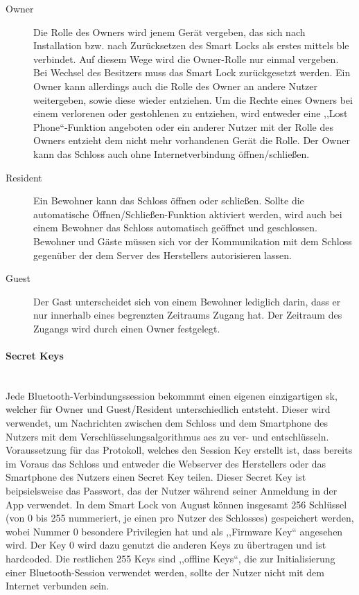 		\begin{description}
		    \item [Owner] Die Rolle des Owners wird jenem Gerät vergeben, das sich nach Installation bzw. nach Zurücksetzen des Smart Locks als erstes mittels \gls{ble} verbindet. 
   		        Auf diesem Wege wird die Owner-Rolle nur einmal vergeben. 
   		        Bei Wechsel des Besitzers muss das Smart Lock zurückgesetzt werden. 
   		        Ein Owner kann allerdings auch die Rolle des Owner an andere Nutzer weitergeben, sowie diese wieder entziehen. 
   		        Um die Rechte eines Owners bei einem verlorenen oder gestohlenen zu entziehen, wird entweder eine ,,Lost Phone``-Funktion angeboten oder ein anderer Nutzer mit der Rolle des Owners entzieht dem nicht mehr vorhandenen Gerät die Rolle. 
   		        Der Owner kann das Schloss auch ohne Internetverbindung öffnen/schließen. 
   	        \item [Resident] Ein Bewohner kann das Schloss öffnen oder schließen. 
   	            Sollte die automatische Öffnen/Schließen-Funktion aktiviert werden, wird auch bei einem Bewohner das Schloss automatisch geöffnet und geschlossen. 
   	            Bewohner und Gäste müssen sich vor der Kommunikation mit dem Schloss gegenüber der dem Server des Herstellers autorisieren lassen.
   	        \item [Guest] Der Gast unterscheidet sich von einem Bewohner lediglich darin, dass er nur innerhalb eines begrenzten Zeitraums Zugang hat. 
                Der Zeitraum des Zugangs wird durch einen Owner festgelegt.
		\end{description}
        
		\paragraph{\textrm{Secret Keys}}\hspace{0pt}\smallskip\\
		Jede Bluetooth-Verbindungssession bekommmt einen eigenen einzigartigen \gls{sk}, welcher für Owner und Guest/Resident unterschiedlich entsteht.
		Dieser wird verwendet, um Nachrichten zwischen dem Schloss und dem Smartphone des Nutzers mit dem Verschlüsselungsalgorithmus \gls{aes} zu ver- und entschlüsseln. 
		Voraussetzung für das Protokoll, welches den Session Key erstellt ist, dass bereits im Voraus das Schloss und entweder die Webserver des Herstellers oder das Smartphone des Nutzers einen Secret Key teilen. 
		Dieser Secret Key ist beipsielsweise das Passwort, das der Nutzer während seiner Anmeldung in der App verwendet. 
		In dem Smart Lock von August können insgesamt 256 Schlüssel (von 0 bis 255 nummeriert, je einen pro Nutzer des Schlosses) gespeichert werden, wobei Nummer 0 besondere Privilegien hat und als ,,Firmware Key`` angesehen wird.\cite{Jmaxxz2016,Fuller2017} 
		Der Key 0 wird dazu genutzt die anderen Keys zu übertragen und ist hardcoded. 
        Die restlichen 255 Keys sind ,,offline Keys``, die zur Initialisierung einer Bluetooth-Session verwendet werden, sollte der Nutzer nicht mit dem Internet verbunden sein.\cite{Fuller2017}
        
